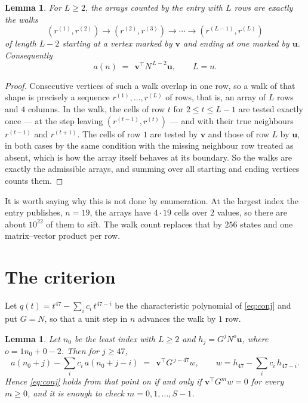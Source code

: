 \documentclass[11pt,a4paper]{article}
\theoremstyle{plain}
\newtheorem{lemma}[theorem]{Lemma}
\theoremstyle{definition}
\begin{document}
\begin{lemma}\label{lem:walk}
For $L\ge2$, the arrays counted by the entry with $L$ rows are exactly the walks
\[
(r^{(1)},r^{(2)})\to(r^{(2)},r^{(3)})\to\cdots\to(r^{(L-1)},r^{(L)})
\]
of length $L-2$ starting at a vertex marked by $\mathbf{v}$ and ending at one marked by
$\mathbf{u}$. Consequently
\[
a(n)\;=\;\,\mathbf{v}^{\!\top}N^{\,L-2}\mathbf{u},\qquad L=n .
\]
\end{lemma}

\begin{proof}
Consecutive vertices of such a walk overlap in one row, so a walk of that shape is
precisely a sequence $r^{(1)},\dots,r^{(L)}$ of rows, that is, an array of $L$ rows
and $4$ columns. In the walk, the cells of row $t$ for $2\le t\le L-1$ are tested
exactly once --- at the step leaving $(r^{(t-1)},r^{(t)})$ --- and with their true
neighbours $r^{(t-1)}$ and $r^{(t+1)}$. The cells of row $1$ are tested by
$\mathbf{v}$ and those of row $L$ by $\mathbf{u}$, in both cases by the same condition
with the missing neighbour row treated as absent, which is how the array itself behaves at
its boundary. So the walks are exactly the admissible arrays, and summing over all starting
and ending vertices counts them.
\end{proof}


It is worth saying why this is not done by enumeration. At the largest index the entry
publishes, $n=19$, the arrays have $4\cdot19$ cells over
$2$ values, so there are about $10^{22}$ of them to sift. The
walk count replaces that by $256$ states and one matrix--vector product per row.
\section{The criterion}

Let $q(t)=t^{47}-\sum_i c_i\,t^{47-i}$ be the characteristic polynomial of
\eqref{eq:conj} and put $G=N$, so that a unit step in $n$ advances the walk by
$1$ row.

\begin{lemma}\label{lem:crit}
Let $n_0$ be the least index with $L\ge2$ and $h_j=G^{j}N^{o}\mathbf{u}$, where
$o=1n_0+0-2$. Then for $j\ge47$,
\[
a(n_0+j)-\sum_i c_i\,a(n_0+j-i)\;=\;\,\mathbf{v}^{\!\top}G^{\,j-47}w,
\qquad w=h_{47}-\sum_i c_i\,h_{47-i} .
\]
Hence \eqref{eq:conj} holds from that point on if and only if
$\mathbf{v}^{\!\top}G^{m}w=0$ for every $m\ge0$, and it is enough to check
$m=0,1,\dots,S-1$.
\end{lemma}
\end{document}
